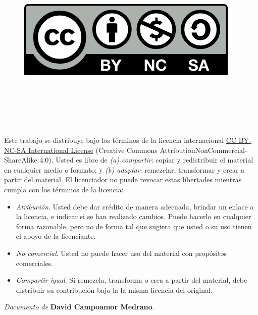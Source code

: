 
\cleardoublepage

\begin{figure}
 \ \ \ \ \includegraphics[width=0.25\linewidth]{figs/by-nc-sa.png}
 \label{fig:cc} 
 \end{figure}

\

\

\

\noindent
Este trabajo se distribuye bajo los términos de la licencia internacional \href{http://creativecommons.org/licenses/by-nc-sa/4.0/}{CC BY-NC-SA International License} (Creative Commons AttributionNonCommercial-ShareAlike 4.0). Usted es libre de \textit{(a) compartir}: copiar y redistribuir el material en cualquier medio o formato; y \textit{(b) adaptar}: remezclar, transformar y crear a partir del material. El licenciador no puede revocar estas libertades mientras cumpla con los términos de la licencia:

\begin{itemize}
\item \textit{Atribución}. Usted debe dar crédito de manera adecuada, brindar un enlace a la licencia, e indicar si se han realizado cambios. Puede hacerlo en cualquier forma razonable, pero no de forma tal que sugiera que usted o su uso tienen el apoyo de la licenciante.
\item \textit{No comercial}. Usted no puede hacer uso del material con propósitos comerciales.
\item \textit{Compartir igual}. Si remezcla, transforma o crea a partir del material, debe distribuir su contribución bajo la la misma licencia del original.
\end{itemize}

\begin{flushright}
		\vspace{7.0 cm}
		\emph{Documento de} \textbf{David Campoamor Medrano}. %
\end{flushright}

